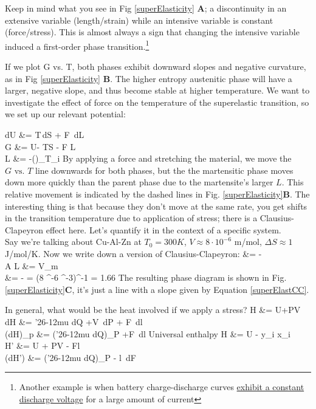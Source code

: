 \documentclass[12pt]{article}
\def\dbar{{\mathchar'26\mkern-12mu d}}
\begin{document}
Keep in mind what you see in Fig \ref{superElasticity} \textbf{A}; a discontinuity in an extensive variable (length/strain) while an intensive variable is constant (force/stress). This is almost always a sign that changing the intensive variable induced a first-order phase transition.\footnote{Another example is when battery charge-discharge curves \href{http://i.stack.imgur.com/UkodS.gif}{exhibit a constant discharge voltage} for a large amount of current}

If we plot G vs. T, both phases exhibit downward slopes and negative curvature, as in Fig \ref{superElasticity} \textbf{B}. The higher entropy austenitic phase will have a larger, negative slope, and thus become stable at higher temperature. We want to investigate the effect of force on the temperature of the superelastic transition, so we set up our relevant potential:

\eqs
dU &= T\,dS + F \,dL\\
G &= U- T\cdot S - F \cdot L\\
L &= -\left(\right)_{T_i}
\eqe
By applying a force and stretching the material, we move the $G\text{ vs. }T$ line downwards for both phases, but the the martensitic phase moves down more quickly than the parent phase due to the martensite's larger $L$. This relative movement is indicated by the dashed lines in Fig. \ref{superElasticity}\textbf{B}. The interesting thing is that because they don't move at the same rate, you get shifts in the transition temperature due to application of stress; there is a Clausius-Clapeyron effect here. Let's quantify it in the context of a specific system.\\

Say we're talking about Cu-Al-Zn at $T_0 = 300K$, $V \approx 8 \cdot 10^{-6}$ m\three/mol, $\Delta S \approx 1$ J/mol/K.  Now we write down a version of Clausius-Clapeyron:
\eqs
{}  &= -\\
A \Delta L &= V_m \Delta \epsilon\\
 &= - = (8 ^{-6}  ^{-3})^{-1} = 1.66 
\label{superElastCC}
\eqe
The resulting phase diagram is shown in Fig. \ref{superElasticity}\textbf{C}, it's just a line with a slope given by Equation \ref{superElastCC}.

In general, what would be the heat involved if we apply a stress?
\eqs
H &= U+PV\\
dH &= \dbar Q +V\, dP + F \,dl\\
(dH)_p &= (\dbar Q)_P +F \,dl
\eqe
Universal enthalpy
\eqs
H &= U - \sum y_i x_i\\
H' &= U + PV - Fl\\
(dH') &= (\dbar Q)_P - l \,dF
\eqe
\end{document}
